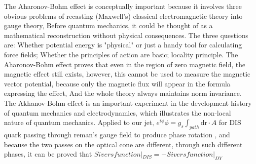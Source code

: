 \documentclass[12pt, a4paper, oneside]{article}
\begin{document}
\begin{spacing}{2.0}
The Aharonov-Bohm effect is conceptually important because it involves three obvious problems of recasting (Maxwell's) classical electromagnetic theory into gauge theory,
Before quantum mechanics, it could be thought of as a mathematical reconstruction without physical consequences.
The three questions are:
Whether potential energy is "physical" or just a handy tool for calculating force fields;
Whether the principles of action are basic;
locality principle.
The Aharonov-Bohm effect proves that even in the region of zero magnetic field, the magnetic effect still exists, however, this cannot be used to measure the magnetic vector potential, because only the magnetic flux will appear in the formula expressing the effect,
And the whole theory always maintains norm invariance. The Akhanov-Bohm effect is an important experiment in the development history of quantum mechanics and electrodynamics, which illustrates the non-local nature of quantum mechanics.
Applied to our jet, $e^{i\phi}$$\phi = g_s \int_{path} \mathrm{d r}\cdot A$ for DIS quark passing through reman's gauge field to produce phase rotation
, and because the two passes on the optical cone are different, through such different phases, it can be proved that $Sivers function|_{DIS} = -Sivers function|_{DY}$



\end{spacing}
\end{document}
